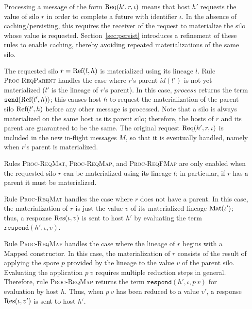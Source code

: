Processing a message of the form ${\textrm{Req}(h', r, \iota)}$ means that host
$h'$ requests the value of silo $r$ in order to complete a future with
identifier $\iota$. In the absence of caching/persisting, this
requires the receiver of the request to materialize the silo whose
value is requested. Section~\ref{sec:persist} introduces a refinement
of these rules to enable caching, thereby avoiding repeated
materializations of the same silo.



The requested silo $r = {\textrm{Ref}(l, h)}$ is materialized using its lineage
$l$. Rule \\\textsc{Proc-ReqParent} handles the case where $r$'s
parent $id(l')$ is not yet materialized ($l'$ is the lineage of $r$'s
parent). In this case, $\mathit{process}$ returns the term
$\texttt{send}({\textrm{Ref}(l', h)})$; this causes host $h$ to request the
materialization of the parent silo ${\textrm{Ref}(l', h)}$ before any other
message is processed. Note that a silo is always materialized on the
same host as its parent silo; therefore, the hosts of $r$ and its
parent are guaranteed to be the same. The original request ${\textrm{Req}(h', r, \iota)}$ is included in the new in-flight messages $M$, so that it
is eventually handled, namely when $r$'s parent is materialized.

Rules \textsc{Proc-ReqMat}, \textsc{Proc-ReqMap}, and
\textsc{Proc-ReqFMap} are only enabled when the requested silo $r$ can
be materialized using its lineage $l$; in particular, if $r$ has a
parent it must be materialized.

Rule \textsc{Proc-ReqMat} handles the case where $r$ does not have a
parent. In this case, the materialization of $r$ is just the value $v$ of its materialized
lineage ${\textrm{Mat}(\iota')}$; thus, a response ${\textrm{Res}(\iota, v)}$ is
sent to host $h'$ by evaluating the term $\texttt{respond}(h', \iota, v)$.

Rule \textsc{Proc-ReqMap} handles the case where the lineage of $r$
begins with a $\text{Mapped}$ constructor. In this case, the
materialization of $r$ consists of the result of applying the spore
$p$ provided by the lineage to the value $v$ of the parent
silo. Evaluating the application $p~v$ requires multiple reduction
steps in general. Therefore, rule \textsc{Proc-ReqMap} returns the
term $\texttt{respond}(h', \iota, p~v)$ for evaluation by host $h$.
Thus, when $p~v$ has been reduced to a value $v'$, a response ${\textrm{Res}(\iota, v')}$ is sent to host $h'$.

